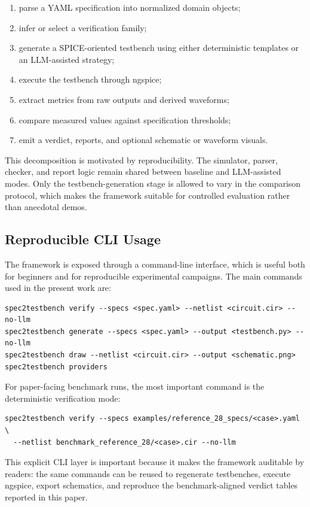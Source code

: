 \documentclass[conference]{IEEEtran}
\begin{document}
\begin{enumerate}
\item parse a YAML specification into normalized domain objects;
\item infer or select a verification family;
\item generate a SPICE-oriented testbench using either deterministic templates or an LLM-assisted strategy;
\item execute the testbench through ngspice;
\item extract metrics from raw outputs and derived waveforms;
\item compare measured values against specification thresholds;
\item emit a verdict, reports, and optional schematic or waveform visuals.
\end{enumerate}

This decomposition is motivated by reproducibility. The simulator, parser, checker, and report logic remain shared between baseline and LLM-assisted modes. Only the testbench-generation stage is allowed to vary in the comparison protocol, which makes the framework suitable for controlled evaluation rather than anecdotal demos.

\subsection{Reproducible CLI Usage}
The framework is exposed through a command-line interface, which is useful both for beginners and for reproducible experimental campaigns. The main commands used in the present work are:

\begin{verbatim}
spec2testbench verify --specs <spec.yaml> --netlist <circuit.cir> --no-llm
spec2testbench generate --specs <spec.yaml> --output <testbench.py> --no-llm
spec2testbench draw --netlist <circuit.cir> --output <schematic.png>
spec2testbench providers
\end{verbatim}

For paper-facing benchmark runs, the most important command is the deterministic verification mode:

\begin{verbatim}
spec2testbench verify --specs examples/reference_28_specs/<case>.yaml \
  --netlist benchmark_reference_28/<case>.cir --no-llm
\end{verbatim}

This explicit CLI layer is important because it makes the framework auditable by readers: the same commands can be reused to regenerate testbenches, execute ngspice, export schematics, and reproduce the benchmark-aligned verdict tables reported in this paper.
\end{document}
